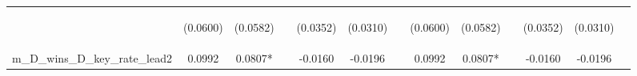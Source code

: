 \documentclass[]{article}
\begin{document}
\begin{center}
\begin{tabular}{lcccccccccccc}
\vspace{4pt} & \begin{footnotesize}(0.0600)\end{footnotesize} & \begin{footnotesize}(0.0582)\end{footnotesize} & \begin{footnotesize}\end{footnotesize} & \begin{footnotesize}(0.0352)\end{footnotesize} & \begin{footnotesize}(0.0310)\end{footnotesize} & \begin{footnotesize}\end{footnotesize} & \begin{footnotesize}(0.0600)\end{footnotesize} & \begin{footnotesize}(0.0582)\end{footnotesize} & \begin{footnotesize}\end{footnotesize} & \begin{footnotesize}(0.0352)\end{footnotesize} & \begin{footnotesize}(0.0310)\end{footnotesize} & \begin{footnotesize}\end{footnotesize} \\
m\_D\_wins\_D\_key\_rate\_lead2 & 0.0992 & 0.0807* &  & -0.0160 & -0.0196 &  & 0.0992 & 0.0807* &  & -0.0160 & -0.0196 &  \\

\end{tabular}
\end{center}
\end{document}

